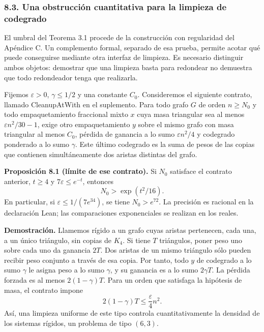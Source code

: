 \documentclass[spanish,11pt,a4paper]{article}
\begin{document}
\subsubsection{8.3. Una obstrucción cuantitativa para la limpieza de codegrado}\label{una-obstruccion-cuantitativa-para-la-limpieza-de-codegrado}

El umbral del Teorema 3.1 procede de la construcción con regularidad del Apéndice C. Un complemento formal, separado de esa prueba, permite acotar qué puede conseguirse mediante otra interfaz de limpieza. Es necesario distinguir ambos objetos: demostrar que una limpieza basta para redondear no demuestra que todo redondeador tenga que realizarla.

Fijemos \(\varepsilon>0\), \(\gamma\le1/2\) y una constante \(C_0\). Consideremos el siguiente contrato, llamado {\ttfamily\small CleanupAtWit\discretionary{\hbox{\ensuremath{\hookrightarrow}}}{}{}h} en el suplemento. Para todo grafo \(G\) de orden \(n\ge N_0\) y todo empaquetamiento fraccional mixto \(x\) cuya masa triangular sea al menos \(\varepsilon n^2/30-1\), exige otro empaquetamiento \(y\) sobre el mismo grafo con masa triangular al menos \(C_0\), pérdida de ganancia a lo sumo \(\varepsilon n^2/4\) y codegrado ponderado a lo sumo \(\gamma\). Este último codegrado es la suma de pesos de las copias que contienen simultáneamente dos aristas distintas del grafo.


\textbf{Proposición 8.1 (límite de ese contrato).} Si \(N_0\) satisface el contrato anterior, \(t\ge4\) y \(7\varepsilon\le e^{-t}\), entonces \[
N_0>\exp(t^2/16).
\tag{8.2}
\] En particular, si \(\varepsilon\le1/(7e^{34})\), se tiene \(N_0>e^{72}\). La precisión es racional en la declaración Lean; las comparaciones exponenciales se realizan en los reales.

\textbf{Demostración.} Llamemos rígido a un grafo cuyas aristas pertenecen, cada una, a un único triángulo, sin copias de \(K_4\). Si tiene \(T\) triángulos, poner peso uno sobre cada uno da ganancia \(2T\). Dos aristas de un mismo triángulo sólo pueden recibir peso conjunto a través de esa copia. Por tanto, todo \(y\) de codegrado a lo sumo \(\gamma\) le asigna peso a lo sumo \(\gamma\), y su ganancia es a lo sumo \(2\gamma T\). La pérdida forzada es al menos \(2(1-\gamma)T\). Para un orden que satisfaga la hipótesis de masa, el contrato impone \[
2(1-\gamma)T\le\frac{\varepsilon}{4}n^2.
\tag{8.3}
\] Así, una limpieza uniforme de este tipo controla cuantitativamente la densidad de los sistemas rígidos, un problema de tipo \((6,3)\).
\end{document}
